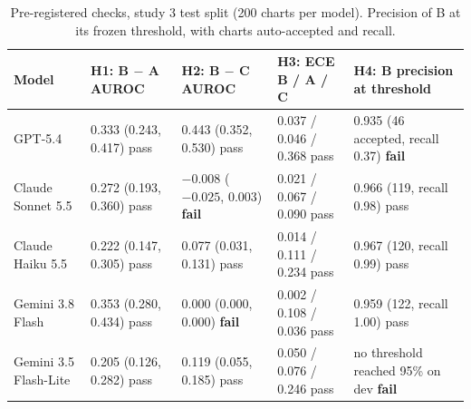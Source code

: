 \documentclass[10pt,letterpaper]{article}
\newcommand{\pass}{pass}
\newcommand{\fail}{\textbf{fail}}
\begin{document}
\begin{table}[!htbp]
\centering\small
\caption{Pre-registered checks, study 3 test split (200 charts per model). Precision of B at its frozen threshold, with charts auto-accepted and recall.}\label{tab:prereg}
\begin{tabularx}{\textwidth}{@{}lp{2.35cm}p{2.35cm}p{2.6cm}L@{}}
\toprule
Model & H1: B $-$ A AUROC & H2: B $-$ C AUROC & H3: ECE B / A / C & H4: B precision at threshold \\
\midrule
GPT-5.4 & 0.333 (0.243, 0.417) \pass & 0.443 (0.352, 0.530) \pass & 0.037 / 0.046 / 0.368 \pass & 0.935 (46 accepted, recall 0.37) \fail \\
Claude Sonnet 5.5 & 0.272 (0.193, 0.360) \pass & $-0.008$ ($-0.025$, 0.003) \fail & 0.021 / 0.067 / 0.090 \pass & 0.966 (119, recall 0.98) \pass \\
Claude Haiku 5.5 & 0.222 (0.147, 0.305) \pass & 0.077 (0.031, 0.131) \pass & 0.014 / 0.111 / 0.234 \pass & 0.967 (120, recall 0.99) \pass \\
Gemini 3.8 Flash & 0.353 (0.280, 0.434) \pass & 0.000 (0.000, 0.000) \fail & 0.002 / 0.108 / 0.036 \pass & 0.959 (122, recall 1.00) \pass \\
Gemini 3.5 Flash-Lite & 0.205 (0.126, 0.282) \pass & 0.119 (0.055, 0.185) \pass & 0.050 / 0.076 / 0.246 \pass & no threshold reached 95\% on dev \fail \\
\bottomrule
\end{tabularx}
\end{table}
\end{document}
